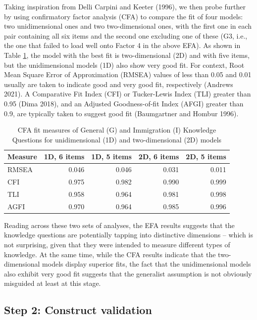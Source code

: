 \documentclass[11pt,halfline,a4paper,]{ouparticle}
\begin{document}
Taking inspiration from Delli Carpini and Keeter (1996), we then probe
further by using confirmatory factor analysis (CFA) to compare the fit
of four models: two unidimensional ones and two two-dimensional ones,
with the first one in each pair containing all six items and the second
one excluding one of these (G3, i.e., the one that failed to load well
onto Factor 4 in the above EFA). As shown in Table \ref{tab:tab3}, the
model with the best fit is two-dimensional (2D) and with five items, but
the unidimensional models (1D) also show very good fit. For context,
Root Mean Square Error of Approximation (RMSEA) values of less than 0.05
and 0.01 usually are taken to indicate good and very good fit,
respectively (Andrews 2021). A Comparative Fit Index (CFI) or
Tucker-Lewis Index (TLI) greater than 0.95 (Dima 2018), and an Adjusted
Goodness-of-fit Index (AFGI) greater than 0.9, are typically taken to
suggest good fit (Baumgartner and Hombur 1996).

\begin{table}

\caption{\label{tab:tab3}CFA fit measures of General (G) and Immigration (I) Knowledge Questions for unidimensional (1D) and two-dimensional (2D) models}
\centering
\begin{tabular}[t]{lrrrr}
\toprule
Measure & 1D, 6 items & 1D, 5 items & 2D, 6 items & 2D, 5 items\\
\midrule
RMSEA & 0.046 & 0.046 & 0.031 & 0.011\\
CFI & 0.975 & 0.982 & 0.990 & 0.999\\
TLI & 0.958 & 0.964 & 0.981 & 0.998\\
AGFI & 0.970 & 0.964 & 0.985 & 0.996\\
\bottomrule
\end{tabular}
\end{table}

Reading across these two sets of analyses, the EFA results suggests that
the knowledge questions are potentially tapping into distinctive
dimensions -- which is not surprising, given that they were intended to
measure different types of knowledge. At the same time, while the CFA
results indicate that the two-dimensional models display superior fits,
the fact that the unidimensional models also exhibit very good fit
suggests that the generalist assumption is not obviously misguided at
least at this stage.

\hypertarget{step-2-construct-validation}{%
\subsection{Step 2: Construct
validation}\label{step-2-construct-validation}}
\end{document}
